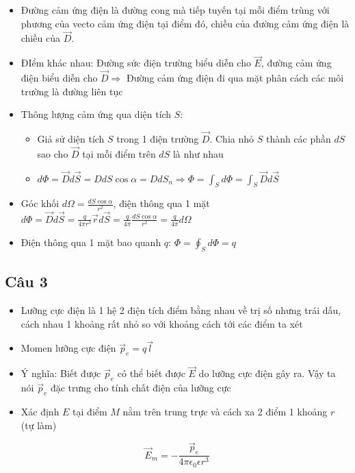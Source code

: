 \begin{itemize}
  \item Đường cảm ứng điện là đường cong mà tiếp tuyến tại mỗi điểm trùng với phương của vecto cảm ứng điện tại điểm đó, chiều của đường cảm ứng điện là chiều của $\vec{D}$.
  \item ĐIểm khác nhau: Đường sức điện trường biểu diễn cho $\vec{E}$, đường cảm ứng điện biểu diễn cho $\vec{D} \Rightarrow$ Đường cảm ứng điện đi qua mặt phân cách các môi trường là đường liên tục
  \item Thông lượng cảm ứng qua diện tích $S$:
  \begin{itemize}
    \item Giả sử diện tích $S$ trong 1 điện trường $\vec{D}$. Chia nhỏ $S$ thành các phần $dS$ sao cho $\vec{D}$ tại mỗi điểm trên $dS$ là như nhau
    \item $d\Phi = \vec{D}d\vec{S} = DdS\cos\alpha = DdS_n \Rightarrow \Phi = \int_S d\Phi = \int_S \vec{D}d\vec{S}$
  \end{itemize}
  \item Góc khối $d\Omega = \frac{dS\cos\alpha}{r^2}$, điện thông qua 1 mặt $d\Phi = \vec{D}d\vec{S} = \frac{q}{4\pi r^3} \vec{r}d\vec{S} = \frac{q}{4\pi} \frac{dS\cos\alpha}{r^2} = \frac{q}{4\pi} d\Omega$
  \item Điện thông qua 1 mặt bao quanh $q$: $\Phi = \oint_S d\Phi = q$
\end{itemize}

\subsection{Câu 3}

\begin{itemize}
  \item Lưỡng cực điện là 1 hệ 2 điện tích điểm bằng nhau về trị số nhưng trái dấu, cách nhau 1 khoảng rất nhỏ so với khoảng cách tới các điểm ta xét
  \item Momen lưỡng cực điện $\vec{p}_e = q\vec{l}$ 
  \item Ý nghĩa: Biết được $\vec{p}_e$ có thể biết được $\vec{E}$ do lưỡng cực điện gây ra. Vậy ta nói $\vec{p}_e$ đặc trưng cho tính chất điện của lưỡng cực
  \item Xác định $E$ tại điểm $M$ nằm trên trung trực và cách xa 2 điểm 1 khoảng $r$ (tự làm)
\end{itemize}

\begin{equation*}
  \vec{E}_m = - \frac{\vec{p}_e}{4\pi\epsilon_0\epsilon r^3}
\end{equation*}

